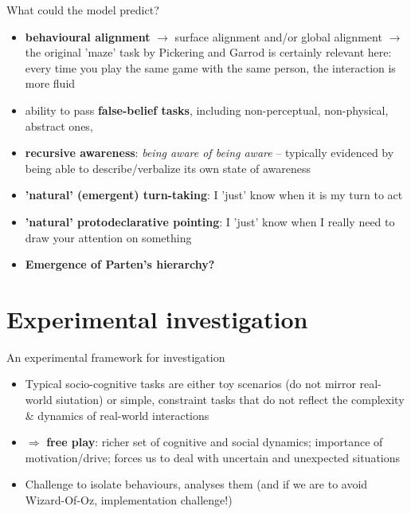 \documentclass[compress]{beamer}
\begin{document}
\begin{frame}{What could the model predict?}

    \begin{itemize}

        \item {\bf behavioural alignment} $\rightarrow$ surface alignment and/or
            global alignment $\rightarrow$ the original 'maze' task by Pickering
            and Garrod is certainly relevant here: every time you play the same
            game with the same person, the interaction is more fluid

        \item ability to pass {\bf false-belief tasks}, including
            non-perceptual, non-physical, abstract ones,

        \item {\bf recursive awareness}: \emph{being aware of being aware} -- typically
            evidenced by being able to describe/verbalize its own state of
            awareness 

        \item {\bf 'natural' (\ie emergent) turn-taking}: I 'just' know when it is my
            turn to act

        \item {\bf 'natural' protodeclarative pointing}: I 'just' know when I really
            need to draw your attention on something

        \item {\bf Emergence of Parten's hierarchy?}

    \end{itemize}

\end{frame}

\section{Experimental investigation}

\begin{frame}{An experimental framework for investigation}

    \begin{itemize}
        \item<1-> Typical socio-cognitive tasks are either toy scenarios (\ie do not mirror
            real-world siutation) or simple, constraint tasks that do not
            reflect the complexity \& dynamics of real-world interactions
        \item<2-> $\Rightarrow$ {\bf free play}: richer set of cognitive and
            social dynamics; importance of motivation/drive; forces us to deal
            with uncertain and unexpected situations
        \item<3-> Challenge to isolate behaviours, analyses them (and if we are
            to avoid Wizard-Of-Oz, implementation challenge!)
    \end{itemize}
\end{frame}
\end{document}
